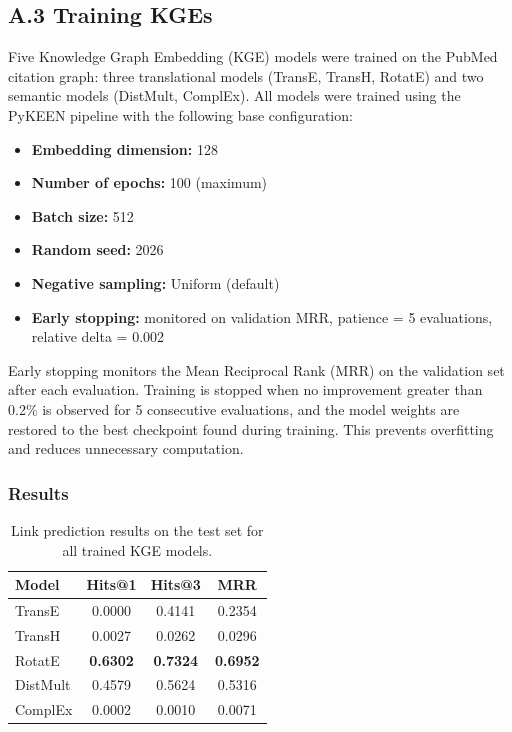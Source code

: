 \documentclass{article}
\begin{document}
\subsection*{A.3 \hspace{0.3em} Training KGEs}

 Five Knowledge Graph Embedding (KGE) models were trained on the PubMed citation
  graph: three translational models (TransE, TransH, RotatE) and two semantic models
  (DistMult, ComplEx). All models were trained using the PyKEEN pipeline with the
  following base configuration:

  \begin{itemize}
      \item \textbf{Embedding dimension:} 128
      \item \textbf{Number of epochs:} 100 (maximum)
      \item \textbf{Batch size:} 512
      \item \textbf{Random seed:} 2026
      \item \textbf{Negative sampling:} Uniform (default)
      \item \textbf{Early stopping:} monitored on validation MRR,
      patience = 5 evaluations, relative delta = 0.002
  \end{itemize}

  Early stopping monitors the Mean Reciprocal Rank (MRR) on the validation set
  after each evaluation. Training is stopped when no improvement greater than 0.2\%
  is observed for 5 consecutive evaluations, and the model weights are restored
  to the best checkpoint found during training. This prevents overfitting and
  reduces unnecessary computation.

  \subsubsection*{Results}

  \begin{table}[h]
  \centering
  \begin{tabular}{lccc}
  \hline
  \textbf{Model} & \textbf{Hits@1} & \textbf{Hits@3} & \textbf{MRR} \\
  \hline
  TransE   & 0.0000 & 0.4141 & 0.2354 \\
  TransH   & 0.0027 & 0.0262 & 0.0296 \\
  RotatE   & \textbf{0.6302} & \textbf{0.7324} & \textbf{0.6952} \\
  DistMult & 0.4579 & 0.5624 & 0.5316 \\
  ComplEx  & 0.0002 & 0.0010 & 0.0071 \\
  \hline
  \end{tabular}
  \caption{Link prediction results on the test set for all trained KGE models.}
  \label{tab:kge_results}
  \end{table}
\end{document}
